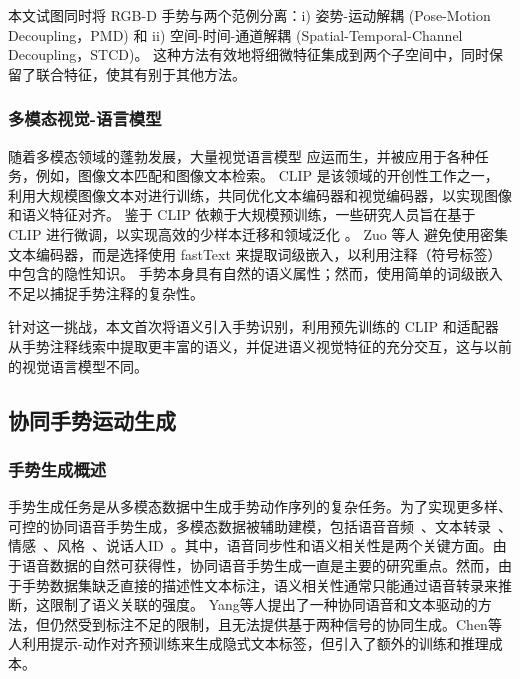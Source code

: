 本文试图同时将 RGB-D 手势与两个范例分离：i) 姿势-运动解耦 (Pose-Motion Decoupling，PMD) 和 ii) 空间-时间-通道解耦 (Spatial-Temporal-Channel Decoupling，STCD)。
这种方法有效地将细微特征集成到两个子空间中，同时保留了联合特征，使其有别于其他方法。

\subsubsection{多模态视觉-语言模型}
随着多模态领域的蓬勃发展，大量视觉语言模型 \cite{radford2021learning, li2022blip} 应运而生，并被应用于各种任务，例如，图像文本匹配和图像文本检索。
CLIP \cite{radford2021learning} 是该领域的开创性工作之一，利用大规模图像文本对进行训练，共同优化文本编码器和视觉编码器，以实现图像和语义特征对齐。
鉴于 CLIP 依赖于大规模预训练，一些研究人员旨在基于 CLIP 进行微调，以实现高效的少样本迁移和领域泛化 \cite{gao2024clip}。
Zuo 等人 \cite{zuo2023natural} 避免使用密集文本编码器，而是选择使用 fastText 来提取词级嵌入，以利用注释（符号标签）中包含的隐性知识。
手势本身具有自然的语义属性；然而，使用简单的词级嵌入不足以捕捉手势注释的复杂性。

针对这一挑战，本文首次将语义引入手势识别，利用预先训练的 CLIP 和适配器从手势注释线索中提取更丰富的语义，并促进语义视觉特征的充分交互，这与以前的视觉语言模型不同。





\subsection{协同手势运动生成}

\subsubsection{手势生成概述}
手势生成任务是从多模态数据中生成手势动作序列的复杂任务。为了实现更多样、可控的协同语音手势生成，多模态数据被辅助建模，包括语音音频~\cite{yang2023diffusestylegesture, yang2023unifiedgesture,xu2025mambatalk}、文本转录~\cite{zhi2023livelyspeaker, pang2023bodyformer,liu2024emage}、情感~\cite{qi2024emotiongesture, qi2024weakly}、风格~\cite{ao2023gesturediffuclip, yang2023diffusestylegesture, ghorbani2023zeroeggs}、说话人ID~\cite{yang2023diffusestylegesture+}。其中，语音同步性和语义相关性是两个关键方面。由于语音数据的自然可获得性，协同语音手势生成一直是主要的研究重点。然而，由于手势数据集缺乏直接的描述性文本标注，语义相关性通常只能通过语音转录来推断，这限制了语义关联的强度。
Yang等人\cite{yang2024freetalker}提出了一种协同语音和文本驱动的方法，但仍然受到标注不足的限制，且无法提供基于两种信号的协同生成。Chen等人\cite{chen2024syntalker}利用提示-动作对齐预训练来生成隐式文本标签，但引入了额外的训练和推理成本。

